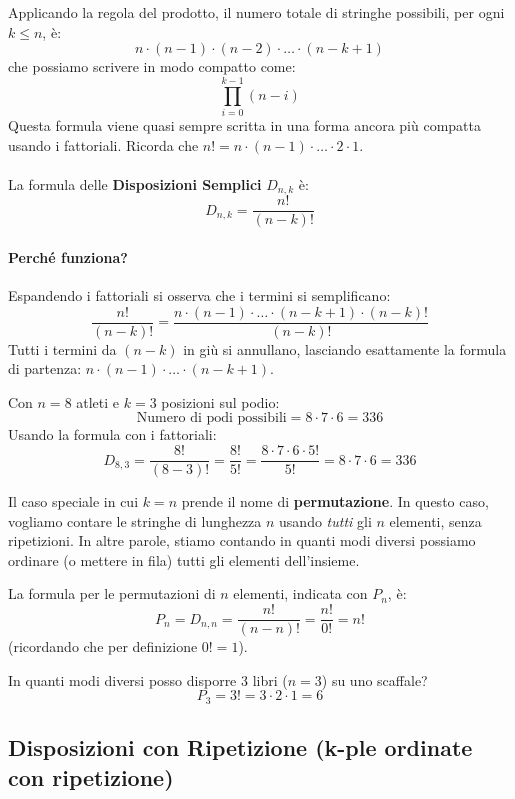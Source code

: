 Applicando la regola del prodotto, il numero totale di stringhe possibili, per ogni $k \le n$, è:
\[ n \cdot (n-1) \cdot (n-2) \cdot \dots \cdot (n - k + 1) \]
che possiamo scrivere in modo compatto come:
\[ \prod_{i=0}^{k-1} (n-i) \]
Questa formula viene quasi sempre scritta in una forma ancora più compatta usando i fattoriali. Ricorda che $n! = n \cdot (n-1) \cdot \dots \cdot 2 \cdot 1$.
\\\\La formula delle \textbf{Disposizioni Semplici} $D_{n,k}$ è:
\[ D_{n,k} = \frac{n!}{(n-k)!} \]

\paragraph{Perché funziona?}
Espandendo i fattoriali si osserva che i termini si semplificano:
\[ \frac{n!}{(n-k)!} = \frac{n \cdot (n-1) \cdot \dots \cdot (n-k+1) \cdot (n-k)!}{(n-k)!} \]
Tutti i termini da $(n-k)$ in giù si annullano, lasciando esattamente la formula di partenza: $n \cdot (n-1) \cdot \dots \cdot (n-k+1)$.

\begin{esempio}
Con $n=8$ atleti e $k=3$ posizioni sul podio:
\[ \text{Numero di podi possibili} = 8 \cdot 7 \cdot 6 = 336 \]
Usando la formula con i fattoriali:
\[ D_{8,3} = \frac{8!}{(8-3)!} = \frac{8!}{5!} = \frac{8 \cdot 7 \cdot 6 \cdot 5!}{5!} = 8 \cdot 7 \cdot 6 = 336 \]
\end{esempio}

\begin{osservazione}
	Il caso speciale in cui $k=n$ prende il nome di \textbf{permutazione}. In questo caso, vogliamo contare le stringhe di lunghezza $n$ usando \emph{tutti} gli $n$ elementi, senza ripetizioni. In altre parole, stiamo contando in quanti modi diversi possiamo ordinare (o mettere in fila) tutti gli elementi dell'insieme.
\end{osservazione}

La formula per le permutazioni di $n$ elementi, indicata con $P_n$, è:
\[ P_n = D_{n,n} = \frac{n!}{(n-n)!} = \frac{n!}{0!} = n! \]
(ricordando che per definizione $0! = 1$).

\begin{esempio}
In quanti modi diversi posso disporre 3 libri ($n=3$) su uno scaffale?
\[ P_3 = 3! = 3 \cdot 2 \cdot 1 = 6 \]
\end{esempio}

\subsection{Disposizioni con Ripetizione (k-ple ordinate con ripetizione)}

